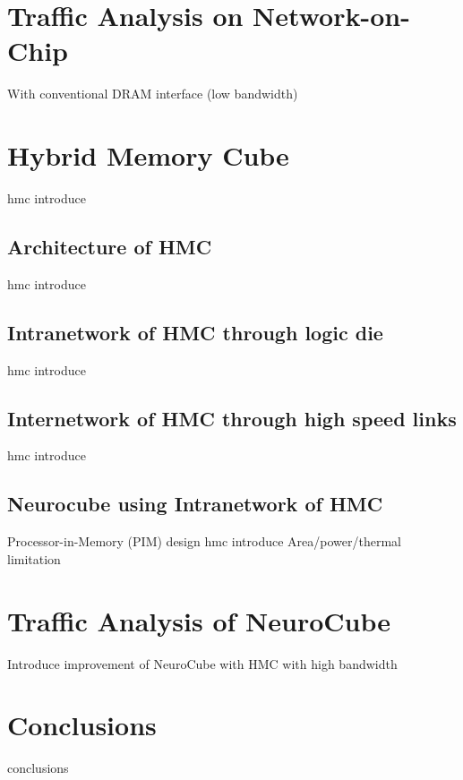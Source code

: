 \documentclass[pageno]{jpaper}
\begin{document}
\section{Traffic Analysis on Network-on-Chip}
With conventional DRAM interface (low bandwidth)

\section{Hybrid Memory Cube}
hmc introduce
\subsection{Architecture of HMC}
hmc introduce
\subsection{Intranetwork of HMC through logic die}
hmc introduce
\subsection{Internetwork of HMC through high speed links}
hmc introduce
\subsection{Neurocube using Intranetwork of HMC}
Processor-in-Memory (PIM) design hmc introduce
Area/power/thermal limitation

\section{Traffic Analysis of NeuroCube}
Introduce improvement of NeuroCube with HMC with high bandwidth


\section{Conclusions}
conclusions




\end{document}
